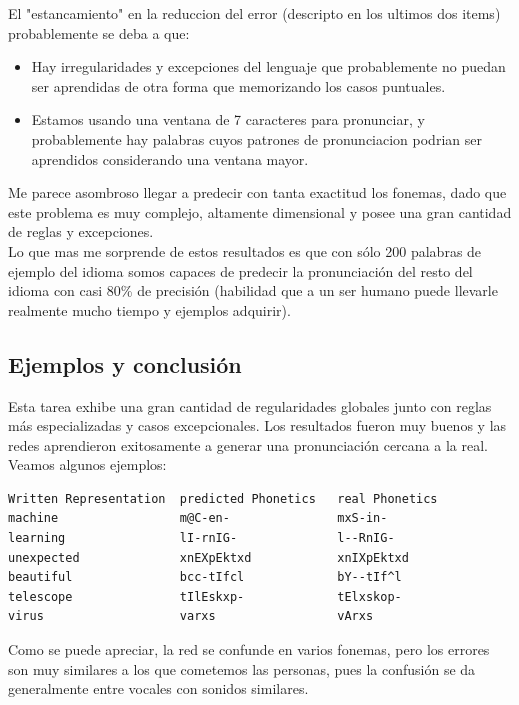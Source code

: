 \documentclass[paper=a4, fontsize=11pt]{scrartcl} %
\numberwithin{equation}{section} %
\numberwithin{figure}{section} %
\numberwithin{table}{section} %
\begin{document}
El "estancamiento" en la reduccion del error (descripto en los ultimos dos items) probablemente se deba a que:

\begin{itemize}
\item Hay irregularidades y excepciones del lenguaje que probablemente no puedan ser aprendidas de otra forma que memorizando los casos puntuales.
\item Estamos usando una ventana de 7 caracteres para pronunciar, y probablemente hay palabras cuyos patrones de pronunciacion podrian ser aprendidos considerando una ventana mayor.
\end{itemize}


Me parece asombroso llegar a predecir con tanta exactitud los fonemas, dado que este problema es muy complejo, altamente dimensional y posee una gran cantidad de reglas y excepciones. \\

Lo que mas me sorprende de estos resultados es que con sólo 200 palabras de ejemplo del idioma somos capaces de predecir la pronunciación del resto del idioma con casi 80\% de precisión (habilidad que a un ser humano puede llevarle realmente mucho tiempo y ejemplos adquirir). \\


\subsection{Ejemplos y conclusión}

Esta tarea exhibe una gran cantidad de regularidades globales junto con reglas más especializadas y casos excepcionales. Los resultados fueron muy buenos y las redes aprendieron exitosamente a generar una pronunciación cercana a la real. Veamos algunos ejemplos:

\begin{center}
\begin{BVerbatim}
Written Representation  predicted Phonetics   real Phonetics  
machine                 m@C-en-               mxS-in-  
learning                lI-rnIG-              l--RnIG- 
unexpected              xnEXpEktxd            xnIXpEktxd  
beautiful               bcc-tIfcl             bY--tIf^l 
telescope               tIlEskxp-             tElxskop- 
virus                   varxs                 vArxs

\end{BVerbatim}
\end{center}


Como se puede apreciar, la red se confunde en varios fonemas, pero los errores son muy similares a los que cometemos las personas, pues la confusión se da generalmente entre vocales con sonidos similares. \\
\newpage
\end{document}
